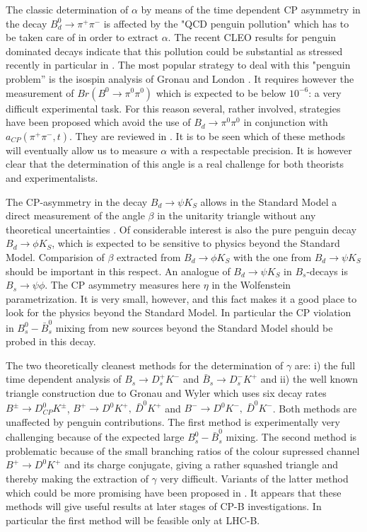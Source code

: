 The classic determination of $\alpha$ by means of the
time dependent CP  asymmetry in the decay
$B_d^0 \rightarrow \pi^+ \pi^-$ 
is affected by the "QCD penguin pollution" which has to be
taken care of in order to extract $\alpha$. 
The recent CLEO results for penguin dominated decays indicate that
this pollution could be substantial as stressed recently in particular
in \cite{ITAL}.
The most popular strategy to deal with this "penguin problem''
is the isospin analysis of Gronau and London \cite{CPASYM}. It
requires however the measurement of $Br(B^0\to \pi^0\pi^0)$ which is
expected to be below $10^{-6}$: a very difficult experimental task.
For this reason several, rather involved, strategies \cite{SNYD} 
have been proposed which
avoid the use of $B_d \to \pi^0\pi^0$ in conjunction with
$a_{CP}(\pi^+\pi^-,t)$. They are reviewed in \cite{BF97}. 
 It is to be seen which of these methods
will eventually allow us to measure $\alpha$ with a respectable precision.
It is however clear that the determination of this angle is a real
challenge for both theorists and experimentalists.

The CP-asymmetry in the decay $B_d \rightarrow \psi K_S$ allows
 in the Standard Model
a direct measurement of the angle $\beta$ in the unitarity triangle
without any theoretical uncertainties \cite {BSANDA}.
Of considerable interest \cite{RF97,PHI} is also the pure penguin decay
$B_d \rightarrow \phi K_S$, which is expected to be sensitive
to physics beyond the Standard Model. Comparision of $\beta$
extracted from $B_d \rightarrow \phi K_S$ with the one from
$B_d \rightarrow \psi K_S$ should be important in this
respect. An analogue of $B_d \rightarrow \psi K_S$ in $B_s$-decays
is $B_s \rightarrow \psi \phi$. The CP asymmetry measures here
$\eta$ \cite{B95} in the Wolfenstein parametrization. It is very
small, however, and this fact makes it a good place to look for the 
physics beyond the Standard Model. In particular the CP violation
in $B^0_s-\bar B^0_s$ mixing from new sources beyond the Standard
Model should be probed in this decay.

The two theoretically cleanest methods for the determination of $\gamma$
are: i) the full time dependent analysis of 
$B_s\to D^+_s K^{-}$ and $\bar B_s\to D^-_s K^{+}$  \cite{adk}
and ii) the well known triangle construction due to Gronau and Wyler 
\cite{Wyler}
which uses six decay rates $B^{\pm}\to D^0_{CP} K^{\pm}$,
$B^+ \to D^0 K^+,~ \bar D^0 K^+$ and  $B^- \to D^0 K^-,~ \bar D^0 K^-$.
Both methods are  unaffected by penguin contributions. 
The first method is experimentally very
challenging because of the
expected large $B^0_s-\bar B^0_s$ mixing. The second method is problematic
because of the small
branching ratios of the colour supressed channel $B^{+}\to D^0 K^{+}$
and its charge conjugate,
giving a rather squashed triangle and thereby
making
the extraction of $\gamma$ very difficult. Variants of the latter method
which could be more promising have been proposed in \cite{DUN2,V97}.
It appears that these methods will give useful results at later stages
of CP-B investigations. In particular the first method will be feasible
only at LHC-B.

